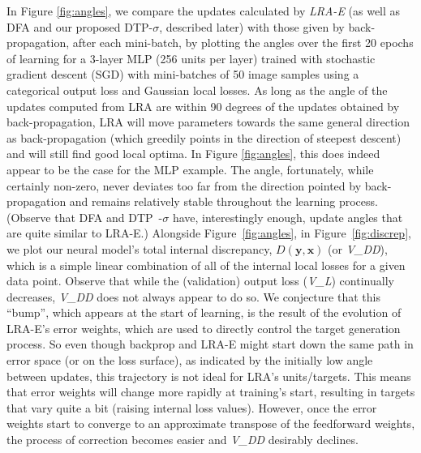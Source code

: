 \documentclass[letterpaper]{article} %
\begin{document}
In Figure \ref{fig:angles}, we compare the updates calculated by \emph{LRA-E} (as well as DFA and our proposed DTP-$\sigma$, described later) with those given by back-propagation, after each mini-batch, by plotting the angles over the first 20 epochs of learning for a 3-layer MLP (256 units per layer) trained with stochastic gradient descent (SGD) with mini-batches of 50 image samples using a categorical output loss and Gaussian local losses.
As long as the angle of the updates computed from LRA are within 90 degrees of the updates obtained by back-propagation, LRA will move parameters towards the same general direction as back-propagation (which greedily points in the direction of steepest descent) and will still find good local optima. In Figure \ref{fig:angles}, this does indeed appear to be the case for the MLP example. The angle, fortunately, while certainly non-zero, never deviates too far from the direction pointed by back-propagation and remains relatively stable throughout the learning process. (Observe that DFA and DTP~-$\sigma$ have, interestingly enough, update angles that are quite similar to LRA-E.)
Alongside Figure~\ref{fig:angles}, in Figure~\ref{fig:discrep}, we plot our neural model's total internal discrepancy, $D(\mathbf{y},\mathbf{x})$ (or \emph{V\_DD}), which is a simple linear combination of all of the internal local losses for a given data point. 
Observe that while the (validation) output loss (\emph{V\_L}) continually decreases, \emph{V\_DD} does not always appear to do so. 
We conjecture that this ``bump'', which appears at the start of learning, is the result of the evolution of LRA-E's error weights, which are used to directly control the target generation process. So even though backprop and LRA-E might start down the same path in error space (or on the loss surface), as indicated by the initially low angle between updates, this trajectory is not ideal for LRA's units/targets. This means that error weights will change more rapidly at training's start, resulting in targets that vary quite a bit (raising internal loss values). However, once the error weights start to converge to an approximate transpose of the feedforward weights, the process of correction becomes easier and \emph{V\_DD} desirably declines. 
\end{document}
